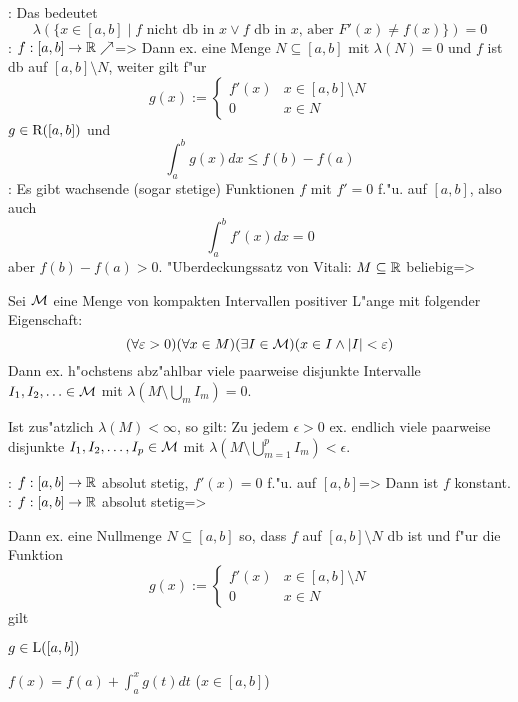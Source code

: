 \remark:{
  Das bedeutet
  \[\lambda(\{x\in[a,b]\mid f \text{ nicht db in $x$} \lor 
    f \text{ db in $x$, aber } F'(x)\ne f(x) \})=0
    \]
  }
\theorem:
  $f:[a,b]\to\SetR\nearrow$=>{
  Dann ex. eine Menge $N\subseteq[a,b]$ mit $\lambda(N)=0$ und $f$ ist db auf
  $[a,b]\setminus N$, weiter gilt f"ur
  \[g(x):=\begin{cases}
      f'(x) & x\in [a,b]\setminus N \\
      0 & x\in N
      \end{cases}
    \]
  $g\in\SetRInt([a,b])$ und
  \[\int_a^b g(x)dx\le f(b)-f(a)
    \]
  }
\remark:{
  Es gibt wachsende (sogar stetige) Funktionen $f$ mit $f'=0$ f."u. auf $[a,b]$,
  also auch
  \[\int_a^b f'(x) dx=0
    \]
  aber $f(b)-f(a)>0$.
  }
\theorem "Uberdeckungssatz von Vitali:
  $M\subseteq \SetR$ beliebig=>{
  Sei $\cal M$ eine Menge von kompakten Intervallen positiver L"ange mit 
  folgender Eigenschaft:
  \[\epsn(\forall x\in M)(\exists I\in\cal M)(x\in I \land |I|<\epsilon)
    \]
  Dann ex. h"ochstens abz"ahlbar viele paarweise disjunkte Intervalle 
  $I_1,I_2,\ldots\in\cal M$ mit $\lambda(M\setminus \bigcup_m I_m)=0$.
  
  Ist zus"atzlich $\lambda(M)<\infty$, so gilt: Zu jedem $\epsilon>0$ ex.
  endlich viele paarweise disjunkte $I_1,I_2,\ldots,I_p\in\cal M$ mit
  $\lambda(M\setminus \bigcup_{m=1}^p I_m)<\epsilon$.
  }
\theorem:
  $f:[a,b]\to\SetR$ absolut stetig, $f'(x)=0$ f."u. auf $[a,b]$=>{
  Dann ist $f$ konstant.
  }
\theorem:
  $f:[a,b]\to\SetR$ absolut stetig=>{
  Dann ex. eine Nullmenge $N\subseteq [a,b]$ so, dass $f$ auf $[a,b]\setminus N$
  db ist und f"ur die Funktion
  \[g(x):=\begin{cases}
      f'(x) & x\in[a,b]\setminus N \\
      0 & x\in N
      \end{cases}
    \]
  gilt
  \begin{stmts}
    \item $g\in\SetLInt([a,b])$
    \item $f(x)=f(a)+\int_a^x g(t)dt$ ($x\in [a,b]$)
    \end{stmts}
  } 
